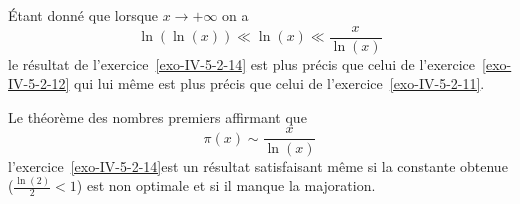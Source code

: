 \begin{sol}
Étant donné que lorsque $x \to + \infty$ on a
$$\ln(\ln(x)) \ll \ln(x) \ll \frac{x}{\ln(x)}$$
le résultat de l'exercice~\ref{exo-IV-5-2-14} est plus précis que celui de l'exercice~\ref{exo-IV-5-2-12} qui lui même est plus précis que celui de l'exercice~\ref{exo-IV-5-2-11}.

Le théorème des nombres premiers affirmant que
$$\pi(x) \sim \frac{x}{\ln(x)}$$
l'exercice~\ref{exo-IV-5-2-14}est un résultat satisfaisant même si la constante obtenue ($\frac{\ln(2)}{2}< 1$) est non optimale et si il manque la majoration.
\end{sol}
